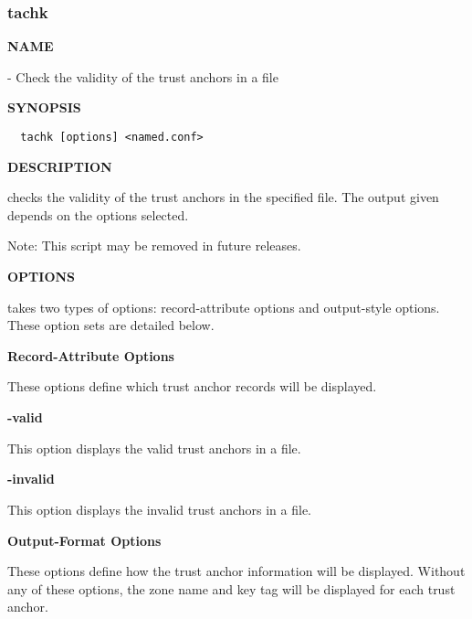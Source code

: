 \clearpage

\subsubsection{tachk}

{\bf NAME}

 - Check the validity of the trust anchors in a 
file

{\bf SYNOPSIS}

\begin{verbatim}
  tachk [options] <named.conf>
\end{verbatim}

{\bf DESCRIPTION}

 checks the validity of the trust anchors in the specified
 file.  The output given depends on the options selected.

Note:  This script may be removed in future releases.

{\bf OPTIONS}

 takes two types of options:  record-attribute options
and output-style options.  These option sets are detailed below.

{\bf Record-Attribute Options}

These options define which trust anchor records will be displayed.

\begin{description}

\item {\bf -valid}\verb" "

This option displays the valid trust anchors in a  file.

\item {\bf -invalid}\verb" "

This option displays the invalid trust anchors in a  file.

\end{description}

{\bf Output-Format Options}

These options define how the trust anchor information will be displayed.
Without any of these options, the zone name and key tag will be displayed
for each trust anchor.

